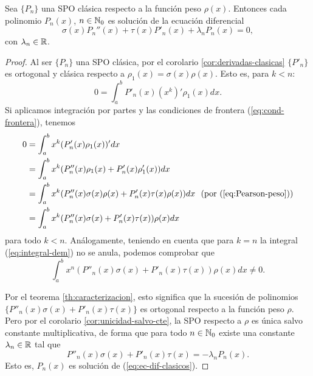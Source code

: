 \begin{teorema}
    Sea $\{P_n\}$ una SPO clásica respecto a la función peso $\rho(x)$. Entonces cada polinomio $P_n(x)$, $n\in\mathbb{N}_0$ es solución de la ecuación diferencial
    \begin{equation}
        \label{eq:ec-dif-clasicos}
        \sigma(x)P_n''(x) + \tau(x)P'_n(x)+\lambda_n P_n(x) = 0,
    \end{equation}
    con $\lambda_n\in\mathbb{R}$.
\end{teorema}
\begin{proof}
    Al ser $\{P_n\}$ una SPO clásica, por el corolario \ref{cor:derivadas-clasicas} $\{P'_n\}$ es ortogonal y clásica respecto a $\rho_1(x)=\sigma(x)\rho(x)$. Esto es, para $k<n$:
    \begin{equation}
        \label{eq:integral-dem}
        0=\int_a^b P'_n(x)(x^k)' \rho_1(x)dx.
    \end{equation}
    Si aplicamos integración por partes y las condiciones de frontera (\ref{eq:cond-frontera}), tenemos
    \begin{equation*}
        \begin{split}
            0&= \int_a^b x^k (P'_n(x) \rho_1(x))'dx \\
            &= \int_a^b x^k (P''_n(x) \rho_1(x)+P'_n(x)\rho_1'(x))dx  \\
            &= \int_a^b x^k (P''_n(x)\sigma(x)\rho(x)+P'_n(x)\tau(x)\rho(x))dx \ \ \text{(por (\ref{eq:Pearson-peso}))}  \\
            &= \int_a^b x^k (P''_n(x)\sigma(x)+P'_n(x)\tau(x))\rho(x)dx
        \end{split}
    \end{equation*}
    para todo $k<n$. Análogamente, teniendo en cuenta que para $k=n$ la integral (\ref{eq:integral-dem}) no se anula, podemos comprobar que
    $$
    \int_a^b x^n (P''_n(x)\sigma(x)+P'_n(x)\tau(x))\rho(x)dx  \neq 0.
    $$
    
    Por el teorema \ref{th:caracterizacion}, esto significa que la sucesión de polinomios $\{P''_n(x)\sigma(x)+P'_n(x)\tau(x)\}$ es ortogonal respecto a la función peso $\rho$. Pero por el corolario \ref{cor:unicidad-salvo-cte}, la SPO respecto a $\rho$ es única salvo constante multiplicativa, de forma que para todo $n\in\mathbb{N}_0$ existe una constante $\lambda_n\in\mathbb{R}$ tal que
    $$
    P''_n(x)\sigma(x)+P'_n(x)\tau(x) = -\lambda_n P_n(x).
    $$
    Esto es, $P_n(x)$ es solución de (\ref{eq:ec-dif-clasicos}).
\end{proof}

